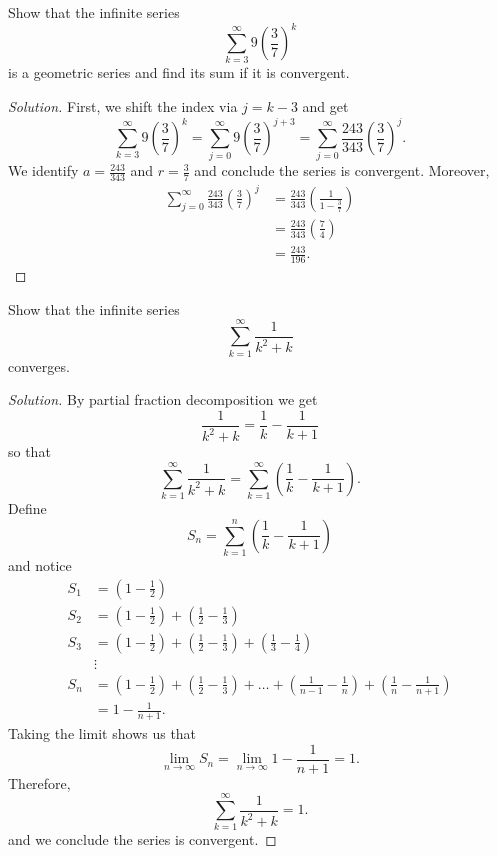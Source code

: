 \documentclass[compacto,10pt,comentarios]{aleph-notas}
\begin{document}
\begin{ejer}
    Show that the infinite series
    $$
        \sum_{k=3}^{\infty} 9 \left( \frac{3}{7} \right)^{k}
    $$
    is a geometric series and find its sum if it is convergent.
\end{ejer}
\begin{proof}[Solution]
    First, we shift the index via $j = k - 3$ and get
    $$
    \sum_{k=3}^{\infty} 9 \left( \frac{3}{7} \right)^{k}
    = \sum_{j=0}^{\infty} 9 \left( \frac{3}{7} \right)^{j+3}
    = \sum_{j=0}^{\infty} \frac{243}{343} \left( \frac{3}{7} \right)^{j}.
    $$
    We identify $a = \frac{243}{343}$ and $r = \frac{3}{7}$ and conclude the series is convergent. Moreover,
    \begin{align*}
    \sum_{j=0}^{\infty} \frac{243}{343} \left( \frac{3}{7} \right)^{j}
    & = \frac{243}{343} \left( \frac{1}{1 - \frac{3}{7}} \right) \\
    & = \frac{243}{343} \left( \frac{7}{4} \right) \\
    & = \frac{243}{196}.
    \end{align*}
\end{proof}

\begin{ejer}
    Show that the infinite series
    $$
        \sum_{k=1}^{\infty} \frac{1}{k^2+k}
    $$
    converges.
\end{ejer}
\begin{proof}[Solution]
    By partial fraction decomposition we get
    $$
        \frac{1}{k^2 + k} = \frac{1}{k} - \frac{1}{k+1}
    $$
    so that
    $$
        \sum_{k=1}^{\infty} \frac{1}{k^2+k}
        = \sum_{k=1}^{\infty} \left( \frac{1}{k} - \frac{1}{k+1} \right).
    $$
    Define
    $$
        S_n = \sum_{k=1}^{n} \left( \frac{1}{k} - \frac{1}{k+1} \right)
    $$
    and notice
    \begin{align*}
        S_1 & = \left(1 - \frac{1}{2} \right) \\
        S_2 & = \left(1 - \frac{1}{2} \right) +  \left(\frac{1}{2} - \frac{1}{3} \right)\\
        S_3 & = \left(1 - \frac{1}{2} \right) +  \left(\frac{1}{2} - \frac{1}{3} \right)
            + \left(\frac{1}{3} - \frac{1}{4} \right) \\
            & \vdots \\
        S_n & = \left(1 - \frac{1}{2} \right) +  \left(\frac{1}{2} - \frac{1}{3} \right) 
            + \ldots + \left(\frac{1}{n-1} - \frac{1}{n} \right)
            + \left( \frac{1}{n} - \frac{1}{n+1} \right) \\
            & = 1 - \frac{1}{n+1}.
    \end{align*}
    Taking the limit shows us that
    $$
        \lim_{n \to \infty} S_n = \lim_{n \to \infty} 1 - \frac{1}{n+1} = 1.
    $$
    Therefore,
    $$
        \sum_{k=1}^{\infty} \frac{1}{k^2+k} = 1.
    $$    
    and we conclude the series is convergent.
\end{proof}
\end{document}
